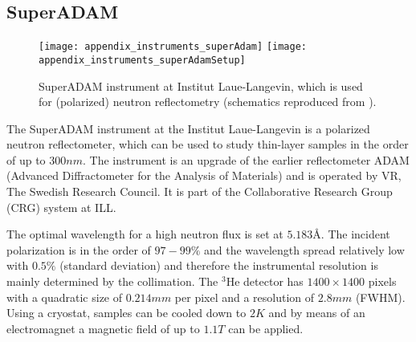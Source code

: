 \documentclass[\main/dresen_thesis.tex]{subfiles}
\begin{document}
  \subsection{SuperADAM}\label{ch:lss:superadam}
    \begin{figure}[ht]
      \centering
      \texttt{[image: appendix\_instruments\_superAdam]}
      \texttt{[image: appendix\_instruments\_superAdamSetup]}
      \caption{\label{fig:lss:superadam}SuperADAM instrument at Institut Laue-Langevin, which is used for (polarized) neutron reflectometry (schematics reproduced from \cite{Devishvili_2015_Super}).}
    \end{figure}
    The SuperADAM instrument at the Institut Laue-Langevin is a polarized neutron reflectometer, which can be used to study thin-layer samples in the order of up to $300 \unit{nm}$.
    The instrument is an upgrade of the earlier reflectometer ADAM (Advanced Diffractometer for the Analysis of Materials) and is operated by VR, The Swedish Research Council.
    It is part of the Collaborative Research Group (CRG) system at ILL.

    The optimal wavelength for a high neutron flux is set at $5.183 \unit{\angstrom}$.
    The incident polarization is in the order of $97 - 99 \unit{\%}$ and the wavelength spread relatively low with $0.5 \unit{\%}$ (standard deviation) and therefore the instrumental resolution is mainly determined by the collimation.
    The $^3\mathrm{He}$ detector has $1400 \times 1400$ pixels with a quadratic size of $0.214 \unit{mm}$ per pixel and a resolution of $2.8 \unit{mm}$ (FWHM).
    Using a cryostat, samples can be cooled down to $2 \unit{K}$ and by means of an electromagnet a magnetic field of up to $1.1 \unit{T}$ can be applied.
\end{document}
